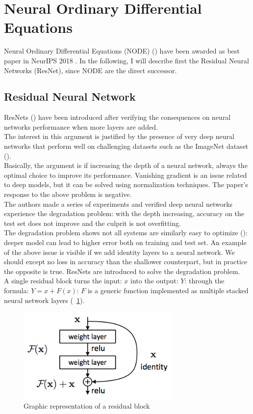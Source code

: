 \documentclass[LaM,binding=0.6cm]{sapthesis}
\begin{document}
\section{Neural Ordinary Differential Equations}
Neural Ordinary Differential Equations (NODE) (\cite{DBLP:journals/corr/abs-1806-07366}) have been awarded as best paper in NeurIPS 2018 . In the following, I will describe first the Residual Neural Networks (ResNet), since NODE are the direct successor.
\subsection{Residual Neural Network}
ResNets (\cite{DBLP:journals/corr/HeZRS15}) have been introduced after verifying the consequences on neural networks performance when more layers are added.\\The interest in this argument is justified by the presence of very deep neural networks that perform well on challenging datasets such as the ImageNet dataset (\cite{Simonyan14verydeep}).\\Basically, the argument is if increasing the depth of a neural network, always the optimal choice to improve its performance. Vanishing gradient is an issue related to deep models, but it can be solved using normalization techniques. The paper's response to the above problem is negative.\\The authors made a series of experiments and verified deep neural networks experience the degradation problem: with the depth increasing, accuracy on the test set does not improve and the culprit is not overfitting.\\The degradation problem shows not all systems are similarly easy to optimize (\cite{DBLP:journals/corr/HeZRS15}): deeper model can lead to higher error both on training and test set. An example of the above issue is visible if we add identity layers to a neural network. We should except no loss in accuracy than the shallower counterpart, but in practice the opposite is true. ResNets are introduced to solve the degradation problem.\\A single residual block turns the input: $x$ into the output: $Y$: through the formula: $Y = x +F(x)$: $F$ is a generic function implemented as multiple stacked neural network layers (~\ref{fig:resnetfunc}).
\begin{figure}[H]  \centering
    \includegraphics[width=80mm,scale=0.7]{resnetfun.png}
    \caption{Graphic representation of a residual block}
    \label{fig:resnetfunc}
\end{figure}
\end{document}
